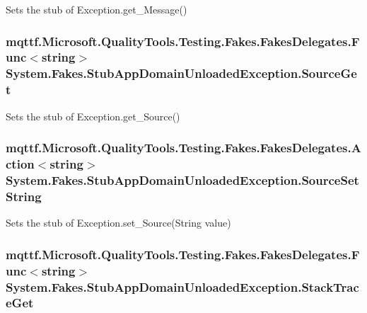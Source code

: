 Sets the stub of Exception.\-get\-\_\-\-Message()

\hypertarget{class_system_1_1_fakes_1_1_stub_app_domain_unloaded_exception_a5dbfbc670517755cfa3ebbc31735240f}{
\subsubsection[{Source\-Get}]{\setlength{\rightskip}{0pt plus 5cm}mqttf.\-Microsoft.\-Quality\-Tools.\-Testing.\-Fakes.\-Fakes\-Delegates.\-Func$<$string$>$ System.\-Fakes.\-Stub\-App\-Domain\-Unloaded\-Exception.\-Source\-Get}}\label{class_system_1_1_fakes_1_1_stub_app_domain_unloaded_exception_a5dbfbc670517755cfa3ebbc31735240f}


Sets the stub of Exception.\-get\-\_\-\-Source()

\hypertarget{class_system_1_1_fakes_1_1_stub_app_domain_unloaded_exception_ad760ae2e01ae4465a53995b4d5a291ba}{
\subsubsection[{Source\-Set\-String}]{\setlength{\rightskip}{0pt plus 5cm}mqttf.\-Microsoft.\-Quality\-Tools.\-Testing.\-Fakes.\-Fakes\-Delegates.\-Action$<$string$>$ System.\-Fakes.\-Stub\-App\-Domain\-Unloaded\-Exception.\-Source\-Set\-String}}\label{class_system_1_1_fakes_1_1_stub_app_domain_unloaded_exception_ad760ae2e01ae4465a53995b4d5a291ba}


Sets the stub of Exception.\-set\-\_\-\-Source(\-String value)

\hypertarget{class_system_1_1_fakes_1_1_stub_app_domain_unloaded_exception_ac49a7be4a61c6d3b03791ada9a653f25}{
\subsubsection[{Stack\-Trace\-Get}]{\setlength{\rightskip}{0pt plus 5cm}mqttf.\-Microsoft.\-Quality\-Tools.\-Testing.\-Fakes.\-Fakes\-Delegates.\-Func$<$string$>$ System.\-Fakes.\-Stub\-App\-Domain\-Unloaded\-Exception.\-Stack\-Trace\-Get}}\label{class_system_1_1_fakes_1_1_stub_app_domain_unloaded_exception_ac49a7be4a61c6d3b03791ada9a653f25}


